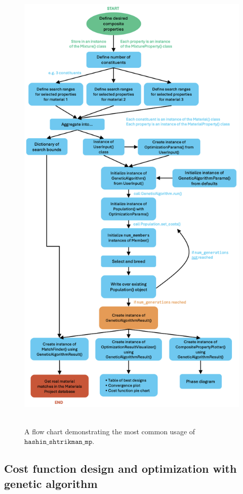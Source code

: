 \begin{figure}
\centering
\includegraphics[width=\linewidth,height=9in,keepaspectratio]{figures/hashin_shtrikman_mp_flow_chart.png}
\caption{A flow chart demonstrating the most common usage of
\(\texttt{hashin\_shtrikman\_mp}\).\label{fig:flow-chart}}
\end{figure}

\subsection{Cost function design and optimization with genetic
algorithm}\label{cost-function-design-and-optimization-with-genetic-algorithm}

